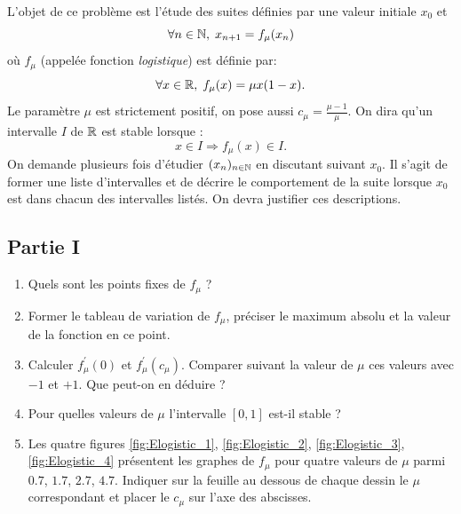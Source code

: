 L'objet de ce problème est l'étude des suites définies par une valeur initiale $x_0$ et
\[
\forall n \in \mathbb{N}, \; x_{n+1}=f_{\mu}(x_n)
\]
où $f_\mu$ (appelée fonction \emph{logistique}) est définie par:
\[
\forall x \in \mathbb{R}, \; f_\mu (x)=\mu x(1-x).
\]
Le paramètre $\mu$ est strictement positif, on pose aussi $c_\mu = \frac{\mu -1}{\mu}$. \newline
On dira qu'un intervalle $I$ de $\mathbb{R}$ est stable lorsque :
\[ 
x\in I \Rightarrow f_\mu (x)\in I.
\] 
On demande plusieurs fois d'étudier $(x_n)_{n\in\mathbb{N}}$ en discutant suivant $x_0$.  Il s'agit de former une liste d'intervalles et de décrire le comportement de la suite lorsque $x_0$ est dans chacun des intervalles listés. On devra justifier ces descriptions.

\subsection*{Partie I}
\begin{enumerate}
\item Quels sont les points fixes de $f_\mu$ ?
\item Former le tableau de variation de $f_\mu$, préciser le maximum absolu et la valeur de la fonction en ce point.
\item Calculer $f_\mu ^\prime (0)$ et $f_\mu ^\prime (c_\mu)$. Comparer suivant la valeur de $\mu$ ces valeurs avec $-1$ et $+1$.  Que peut-on en déduire ?
\item Pour quelles valeurs de $\mu$ l'intervalle $[0,1]$ est-il stable ?
\item Les quatre figures \ref{fig:Elogistic_1}, \ref{fig:Elogistic_2}, \ref{fig:Elogistic_3}, \ref{fig:Elogistic_4} présentent les graphes de $f_\mu$ pour quatre valeurs de $\mu$ parmi $0.7$, $1.7$, $2.7$, $4.7$. Indiquer sur la feuille au dessous de chaque dessin le $\mu$ correspondant et placer le $c_\mu$ sur l'axe des abscisses. 
\end{enumerate}

